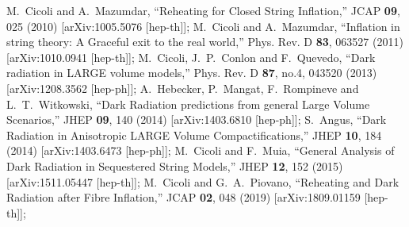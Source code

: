 \documentclass[%
aps,prd,nofootinbib,showkeys,a4paper,10pt
]{revtex4-2}
\begin{document}
\begin{thebibliography}{10}
M.~Cicoli and A.~Mazumdar,
``Reheating for Closed String Inflation,''
JCAP \textbf{09}, 025 (2010)
[arXiv:1005.5076 [hep-th]];
M.~Cicoli and A.~Mazumdar,
``Inflation in string theory: A Graceful exit to the real world,''
Phys. Rev. D \textbf{83}, 063527 (2011)
[arXiv:1010.0941 [hep-th]];
M.~Cicoli, J.~P.~Conlon and F.~Quevedo,
``Dark radiation in LARGE volume models,''
Phys. Rev. D \textbf{87}, no.4, 043520 (2013)
[arXiv:1208.3562 [hep-ph]];
A.~Hebecker, P.~Mangat, F.~Rompineve and L.~T.~Witkowski,
``Dark Radiation predictions from general Large Volume Scenarios,''
JHEP \textbf{09}, 140 (2014)
[arXiv:1403.6810 [hep-ph]];
S.~Angus,
``Dark Radiation in Anisotropic LARGE Volume Compactifications,''
JHEP \textbf{10}, 184 (2014)
[arXiv:1403.6473 [hep-ph]];
M.~Cicoli and F.~Muia,
``General Analysis of Dark Radiation in Sequestered String Models,''
JHEP \textbf{12}, 152 (2015)
[arXiv:1511.05447 [hep-th]];
M.~Cicoli and G.~A.~Piovano,
``Reheating and Dark Radiation after Fibre Inflation,''
JCAP \textbf{02}, 048 (2019)
[arXiv:1809.01159 [hep-th]];





\end{thebibliography}
\end{document}
